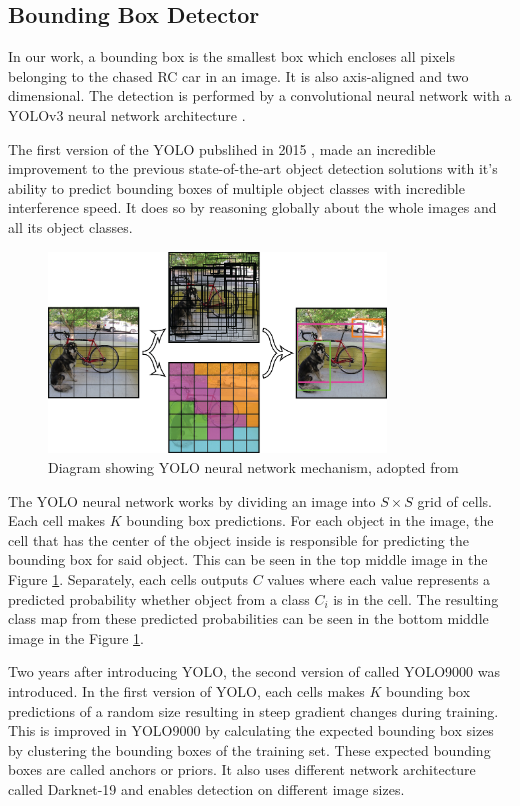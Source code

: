 \subsection{Bounding Box Detector}
In our work, a bounding box is the smallest box which encloses all pixels belonging to the chased RC car in an image. It is also axis-aligned and two dimensional. The detection is performed by a convolutional neural network \cite{CNN_Lecun} with a YOLOv3 neural network architecture \cite{YOLOv3}. \par 
The first version of the YOLO pubslihed in 2015 \cite{YOLO}, made an incredible improvement to the previous state-of-the-art object detection solutions with it's ability to predict bounding boxes of multiple object classes with incredible interference speed. It does so by reasoning globally about the whole images and all its object classes. \par
\begin{figure}[h!]
    \centering
    \includegraphics[width=0.8\textwidth]{images/YOLO.png}
    
    \caption{Diagram showing YOLO neural network mechanism, adopted from \protect\cite{YOLO}}\label{f:YOLO}
\end{figure}

The YOLO neural network works by dividing an image into $S\times S$ grid of cells. Each cell makes $K$ bounding box predictions. For each object in the image, the cell that has the center of the object inside is responsible for predicting the bounding box for said object. This can be seen in the top middle image in the Figure \ref{f:YOLO}. Separately, each cells outputs $C$ values where each value represents a predicted probability whether object from a class $C_i$ is in the cell. The resulting class map from these predicted probabilities can be seen in the bottom middle image in the Figure \ref{f:YOLO}. 
\par
Two years after introducing YOLO, the second version of called YOLO9000 \cite{YOLO9000} was introduced.  In the first version of YOLO, each cells makes $K$ bounding box predictions of a random size resulting in steep gradient changes during training. %
This is improved in YOLO9000 by calculating the expected bounding box sizes by clustering the bounding boxes of the training set. These expected bounding boxes are called anchors or priors. It also uses different network architecture called Darknet-19 and enables detection on different image sizes. \par

